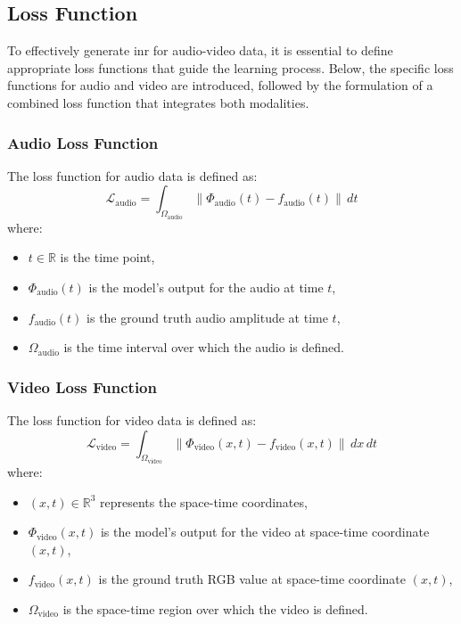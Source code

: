 \documentclass{ioereport}
\begin{document}
    \subsection{Loss Function}
    To effectively generate \gls{inr} for audio-video data, it is essential to define appropriate loss functions that guide the learning process. Below, the specific loss functions for audio and video are introduced, followed by the formulation of a combined loss function that integrates both modalities.

        \subsubsection{Audio Loss Function}
        The loss function for audio data is defined as:
        \begin{equation}
            \mathcal{L}_{\text{audio}} = \int_{\Omega_{\text{audio}}} \| \Phi_{\text{audio}}(t) - f_{\text{audio}}(t) \| \, dt
        \end{equation}
        where:
        \begin{itemize}
            \item \( t \in \mathbb{R} \) is the time point,
            \item  \( \Phi_{\text{audio}}(t) \) is the model's output for the audio at time \( t \),
            \item \( f_{\text{audio}}(t) \) is the ground truth audio amplitude at time \( t \),
            \item \( \Omega_{\text{audio}} \) is the time interval over which the audio is defined.
        \end{itemize}
    
        \subsubsection{Video Loss Function}
            The loss function for video data is defined as:
        \begin{equation}
            \mathcal{L}_{\text{video}} = \int_{\Omega_{\text{video}}} \| \Phi_{\text{video}}(x, t) - f_{\text{video}}(x, t) \| \, dx \, dt
        \end{equation}
        where:
        \begin{itemize}
        \item \( (x, t) \in \mathbb{R}^3 \) represents the space-time coordinates,
        \item \( \Phi_{\text{video}}(x, t) \) is the model's output for the video at space-time coordinate \( (x, t) \),
        \item \( f_{\text{video}}(x, t) \) is the ground truth RGB value at space-time coordinate \( (x, t) \),
        \item \( \Omega_{\text{video}} \) is the space-time region over which the video is defined.
        \end{itemize}
    
\end{document}
